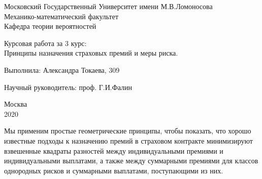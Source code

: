 \documentclass[12pt,a4paper]{article}
\begin{document}
\begin{titlepage}

 \begin{center}
 Московский Государственный Университет имени М.В.Ломоносова \\
Механико-математический факультет\\
Кафедра теории вероятностей
  \end{center}

 \vspace{3cm}
 
 \begin{center}
   
  {  Курсовая работа за 3 курс:\\
  Принципы назначения страховых премий и меры риска.}
   
    \vspace{5cm}
\end{center}     
   
     
   \hspace{170pt}  {Выполнила: Александра Токаева,  309 \\}
       
 \vspace{0.1cm}
  \hspace{170pt} 	  Научный руководитель:  проф. Г.И.Фалин\\

\vspace{4cm}

  \begin{center}
  {Москва\\
  2020}
  \end{center}  
  
\newpage
\tableofcontents
 
 
\end{titlepage}

{\center Мы применим простые геометрические принципы, чтобы показать, что хорошо известные подходы к назначению премий 
в страховом контракте минимизируют взвешенные квадраты разностей между индивидуальными премиями и индивидуальными выплатами, а также между суммарными премиями для классов однородных рисков и суммарными выплатами, поступающими из них. }
\end{document}
